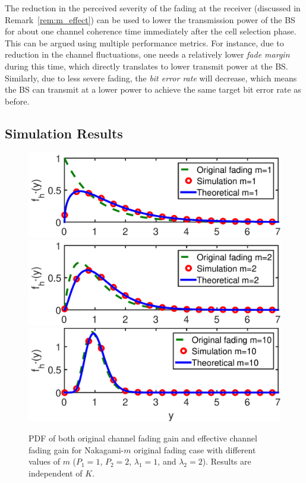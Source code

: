 \documentclass[final]{IEEEtran}
\begin{document}
\begin{remark}
\label{rem:SysDesign}
The reduction in the perceived severity of the fading at the receiver (discussed in Remark~\ref{rem:m_effect}) can be used to lower the transmission power of the BS for about one channel coherence time immediately after the cell selection phase. This can be argued using multiple performance metrics. For instance, due to reduction in the channel fluctuations, one needs a relatively lower {\em fade margin} during this time, which directly translates to lower transmit power at the BS. Similarly, due to less severe fading, the {\em bit error rate} will decrease, which means the BS can transmit at a lower power to achieve the same target bit error rate as before.
\end{remark}
\vspace{-3ex}
\subsection{Simulation Results} 
\begin{figure}
\centering
\includegraphics[width=0.7\columnwidth]{Dhillon_WCL2017-0261_fig1}
\includegraphics[width=0.7\columnwidth]{Dhillon_WCL2017-0261_fig2}
\includegraphics[width=0.7\columnwidth]{Dhillon_WCL2017-0261_fig3}
\caption{PDF of both original channel fading gain and effective channel fading gain for Nakagami-$m$ original fading case with different values of $m$ ($P_1=1$, $P_2=2$, $\lambda_1=1$, and $\lambda_2=2$). Results are independent of $K$.
}
\label{fig}
\vspace{-3mm}
\end{figure}
\end{document}
